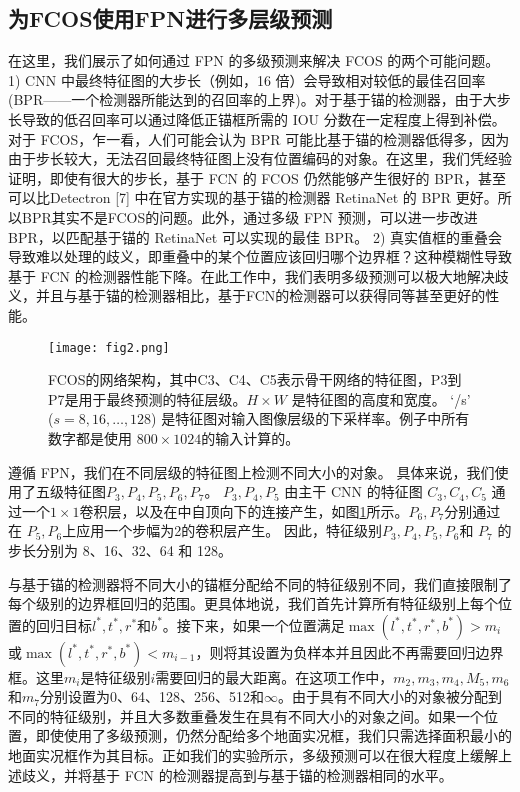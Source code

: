 \documentclass[../main.tex]{subfile}
\begin{document}
\subsection{为FCOS使用FPN进行多层级预测}

在这里，我们展示了如何通过 FPN\cite{fpn} 的多级预测来解决 FCOS 的两个可能问题。 1) CNN 中最终特征图的大步长（例如，16 倍）会导致相对较低的最佳召回率 (BPR——一个检测器所能达到的召回率的上界)。对于基于锚的检测器，由于大步长导致的低召回率可以通过降低正锚框所需的 IOU 分数在一定程度上得到补偿。对于 FCOS，乍一看，人们可能会认为 BPR 可能比基于锚的检测器低得多，因为由于步长较大，无法召回最终特征图上没有位置编码的对象。在这里，我们凭经验证明，即使有很大的步长，基于 FCN 的 FCOS 仍然能够产生很好的 BPR，甚至可以比Detectron [7] 中在官方实现的基于锚的检测器 RetinaNet\cite{retinanet} 的 BPR 更好。所以BPR其实不是FCOS的问题。此外，通过多级 FPN 预测\cite{fpn}，可以进一步改进 BPR，以匹配基于锚的 RetinaNet 可以实现的最佳 BPR。 2) 真实值框的重叠会导致难以处理的歧义，即重叠中的某个位置应该回归哪个边界框？这种模糊性导致基于 FCN 的检测器性能下降。在此工作中，我们表明多级预测可以极大地解决歧义，并且与基于锚的检测器相比，基于FCN的检测器可以获得同等甚至更好的性能。

\begin{figure}[htb]
    \centering
    \texttt{[image: fig2.png]}
    \caption{FCOS的网络架构，其中C3、C4、C5表示骨干网络的特征图，P3到P7是用于最终预测的特征层级。$H \times  W$ 是特征图的高度和宽度。 ‘/s’ ($s = 8,16,\ldots,128$) 是特征图对输入图像层级的下采样率。例子中所有数字都是使用 $800 \times  1024$的输入计算的。}
    \label{fig:fig2}
\end{figure}

遵循 FPN\cite{fpn}，我们在不同层级的特征图上检测不同大小的对象。 具体来说，我们使用了五级特征图$P_3,P_4,P_5,P_6,P_7$。 $P_3,P_4,P_5$ 由主干 CNN 的特征图 $C_3,C_4,C_5$ 通过一个$ 1\times 1 $卷积层，以及在\cite{fpn}中自顶向下的连接产生，如图\ref{fig:fig2}所示。$P_6,P_7$分别通过在 $P_5,P_6$上应用一个步幅为2的卷积层产生。 因此，特征级别$P_3,P_4,P_5,P_6$和 $P_7$ 的步长分别为 8、16、32、64 和 128。

与基于锚的检测器将不同大小的锚框分配给不同的特征级别不同，我们直接限制了每个级别的边界框回归的范围。更具体地说，我们首先计算所有特征级别上每个位置的回归目标$ l^\ast, t^\ast, r^\ast$和$ b^\ast$。接下来，如果一个位置满足$\max\left( l^\ast,  t^\ast,  r^\ast,  b^\ast \right) > m_i $或$\max\left( l^\ast,  t^\ast,  r^\ast,  b^\ast \right) < m_{i-1} $，则将其设置为负样本并且因此不再需要回归边界框。这里$ m_i $是特征级别$ i $需要回归的最大距离。在这项工作中，$m_2,m_3,m_4,M_5, m_6$和$m_7$分别设置为0、64、128、256、512和$\infty$。由于具有不同大小的对象被分配到不同的特征级别，并且大多数重叠发生在具有不同大小的对象之间。如果一个位置，即使使用了多级预测，仍然分配给多个地面实况框，我们只需选择面积最小的地面实况框作为其目标。正如我们的实验所示，多级预测可以在很大程度上缓解上述歧义，并将基于 FCN 的检测器提高到与基于锚的检测器相同的水平。
\end{document}
